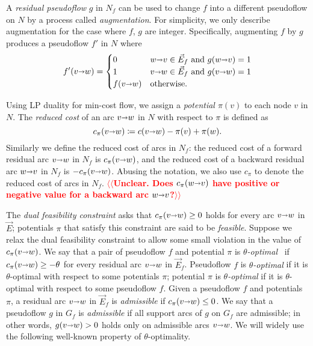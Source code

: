 \documentclass[a4paper,UKenglish]{socg-lipics-v2018}
\makeatletter
\def\eps{\varepsilon}
\def\arcto{\mathord\shortrightarrow}
\def\arc#1#2{#1\arcto#2}
\theoremstyle{plain}
\numberwithin{figure}{section}
\def\EMPH#1{\textcolor{BrickRed}{{\emph{#1}}}}
\def\n@te#1{\textsf{\boldmath \textbf{$\langle\!\langle$#1$\rangle\!\rangle$}}\leavevmode}
\def\note#1{\textcolor{red}{\n@te{#1}}}
\makeatother
\begin{document}
A \EMPH{residual pseudoflow} $g$ in $N_f$ can be used to change $f$ into a
different pseudoflow on $N$ by a process called \EMPH{augmentation}.
For simplicity, we only describe augmentation for the case where $f$, $g$ are integer.
Specifically, augmenting $f$ by $g$ produces a pseudoflow $f'$ in $N$ where
\[
f'(\arc vw) = \begin{cases}
	0 & {\arc wv} \in \vec{E}_f \text{ and } g(\arc wv) = 1 \\
	1 & {\arc vw} \in \vec{E}_f \text{ and } g(\arc vw) = 1 \\
	f(\arc vw) & \text{otherwise.}
\end{cases}
\]

Using LP duality for min-cost flow, we assign a \EMPH{potential $\pi(v)$} to each node $v$ in $N$.
The \EMPH{reduced cost} of an arc $\arc{v}{w}$ in $N$ with respect to $\pi$ is
defined as
\[
c_\pi(\arc vw) \coloneqq c(\arc vw) - \pi(v) + \pi(w).
\]
Similarly we define the reduced cost of arcs in $N_f$: the reduced cost of a
forward residual arc $\arc vw$ in $N_f$ is $c_\pi(\arc vw)$, and the reduced cost of a
backward residual arc $\arc wv$ in $N_f$ is $-c_\pi(\arc vw)$.
Abusing the notation, we also use $c_\pi$ to denote the reduced cost of arcs in
$N_f$. \note{Unclear.  Does $c_\pi(\arc wv)$ have positive or negative value for a backward arc $\arc wv$?}

The \EMPH{dual feasibility constraint} asks that $c_\pi(\arc vw) \geq 0$ holds
for every arc $\arc vw$ in $\vec{E}$;
potentials $\pi$ that satisfy this constraint are said to be \EMPH{feasible}.
Suppose we relax the dual feasibility constraint to allow some small violation
in the value of $c_\pi(\arc vw)$.
We say that a pair of pseudoflow $f$ and potential $\pi$ is
\EMPH{$\theta$-optimal}~\cite{T85,BE87}
if $c_\pi(\arc vw) \geq -\theta$ for every residual arc $\arc vw$ in $\vec{E}_f$.
Pseudoflow $f$ is \emph{$\theta$-optimal} if it is $\theta$-optimal with
respect to some potentials $\pi$;
potential $\pi$ is \emph{$\theta$-optimal} if it is $\theta$-optimal with
respect to some pseudoflow $f$.
Given a pseudoflow $f$ and potentials $\pi$, a residual arc $\arc vw$ in
$\vec{E}_f$ is \EMPH{admissible} if $c_\pi(\arc vw) \leq 0$.
We say that a pseudoflow $g$ in $G_f$ is \EMPH{admissible} if all support arcs
of $g$ on $G_f$ are admissible; in other words, $g(\arc vw) > 0$ holds only on
admissible arcs $\arc vw$.
We will widely use the following well-known property of $\theta$-optimality.
\end{document}
